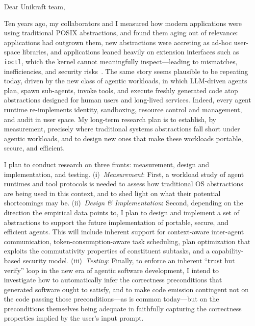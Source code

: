 

\fontsize{9.4pt}{11.5pt}\selectfont

\vspace{2pt}


Dear Unikraft team,

Ten years ago, my collaborators and I measured how modern applications
were using traditional POSIX abstractions, and found them aging out of
relevance: applications had outgrown them, new abstractions were accreting
as ad-hoc user-space libraries, and applications leaned heavily on extension
interfaces such as \texttt{ioctl}, which the kernel cannot meaningfully
inspect---leading to mismatches, inefficiencies, and security
risks~. The same story seems plausible to
be repeating today, driven by the new class of agentic workloads, in which
LLM-driven agents plan, spawn sub-agents, invoke tools, and execute freshly
generated code atop abstractions designed for human users and long-lived services.
Indeed, every agent runtime re-implements identity, sandboxing, resource control and
management, and audit in user space.
My long-term research plan is to establish, by measurement, precisely where
traditional systems abstractions fall short under agentic workloads, and to
design new ones that make these workloads portable, secure, and efficient.

 I plan to conduct research on three fronts: measurement,
design and implementation, and testing.
(i)~\emph{Measurement}: First, a workload study of agent runtimes and tool protocols
is needed to assess how traditional OS abstractions are being used in this
context, and to shed light on what their potential shortcomings may be.
(ii)~\emph{Design \& Implementation}: Second, depending on the direction the empirical
data points to, I plan to design and implement a set of abstractions
to support the future implementation of portable, secure, and efficient agents.
This will include inherent support for context-aware inter-agent communication,
token-consumption-aware task scheduling, plan optimization that exploits the commutativity
properties of constituent subtasks, and a
capability-based security model.
(iii)~\emph{Testing}: Finally, to enforce an inherent ``trust but verify'' loop in
the new era of agentic software development, I intend to investigate how to
automatically infer the correctness preconditions that generated software ought
to satisfy, and to make code emission contingent not on the code passing those
preconditions---as is common today---but on the preconditions themselves being
adequate in faithfully capturing the correctness properties implied by
the user's input prompt.

